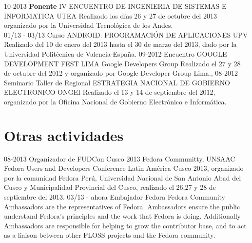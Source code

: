 \documentclass[]{friggeri-cv}
\begin{document}
\begin{entrylist}
    \entry
    {10-2013}
    {\textbf{Ponente} IV ENCUENTRO DE INGENIERIA DE SISTEMAS E INFORMATICA}
    {UTEA}
    {Realizado los d\'ias 26 y 27 de octubre del 2013 organizado por la Universidad
    Tecnol\'ogica de los Andes.\\}
    \entry
    {01/13 - 03/13}
    {Curso ANDROID{:} PROGRAMACI\'ON DE APLICACIONES}
    {UPV}
    {Realizado del 10 de enero del 2013 hasta el 30 de marzo del 2013, dado por
    la Universidad Polit\'ecnica de Valencia-Espa\~na.}
    \entry
    {09-2012}
    {Encuentro GOOGLE DEVELOPMENT FEST LIMA}
    {Google Developers Group}
    {Realizado el 27 y 28 de octubre del 2012 y organizado por Google Developer Group Lima.},
    \entry
    {08-2012}
    {Seminario Taller de Regional ESTRATEGIA NACIONAL DE GOBIERNO ELECTRONICO}
    {ONGEI}
    {Realizado el 13 y 14 de septiembre del 2012, organizado por la Oficina
    Nacional de Gobierno Electr\'onico e Inform\'atica.}
\end{entrylist}
\section{Otras actividades}
\begin{entrylist}
    \entry
    {08-2013}
    {Organizador de FUDCon Cusco 2013}
    {Fedora Communitty, UNSAAC}
    {Fedora Users and Developers Conference Latin América Cusco 2013, organizado
    por la comunidad Fedora Perú, Universidad Nacional de San Antonio Abad del
    Cusco y Municipalidad Provincial del Cusco, realizado el 26,27 y 28 de
    septiembre del 2013.}
    \entry
    {03/13 - ahora}
    {Embajador Fedora}
    {Fedora Community}
    {Ambassadors are the representatives of Fedora. Ambassadors ensure the public
    understand Fedora's principles and the work that Fedora is doing. Additionally
    Ambassadors are responsible for helping to grow the contributor base, and to
    act as a liaison between other FLOSS projects and the Fedora community. }
\end{entrylist}
%
\end{document}
